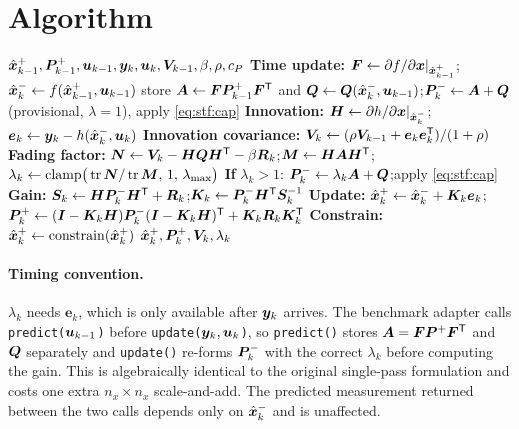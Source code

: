 \section{Algorithm}
\begin{algorithm}[H]
\caption{STF --- one sampling period}
\begin{algorithmic}[1]
\Require $\hat{\bm{x}}^{+}_{k-1},\bm{P}^{+}_{k-1},\bm{u}_{k-1},\bm{y}_k,\bm{u}_k,\bm{V}_{k-1},\beta,\rho,c_P$
\State \textbf{Time update:} $\bm{F}\gets\partial f/\partial\bm{x}|_{\hat{\bm{x}}^{+}_{k-1}}$;\quad $\hat{\bm{x}}^{-}_k\gets f(\hat{\bm{x}}^{+}_{k-1},\bm{u}_{k-1})$
\State \quad store $\bm{A}\gets\bm{F}\bm{P}^{+}_{k-1}\bm{F}^{\mathsf{T}}$ and $\bm{Q}\gets\bm{Q}(\hat{\bm{x}}^{-}_k,\bm{u}_{k-1})$;\quad $\bm{P}^{-}_k\gets\bm{A}+\bm{Q}$ (provisional, $\lambda=1$), apply \eqref{eq:stf:cap}
\State \textbf{Innovation:} $\bm{H}\gets\partial h/\partial\bm{x}|_{\hat{\bm{x}}^{-}_k}$;\quad $\bm{e}_k\gets\bm{y}_k-h(\hat{\bm{x}}^{-}_k,\bm{u}_k)$
\State \textbf{Innovation covariance:} $\bm{V}_k\gets(\rho\bm{V}_{k-1}+\bm{e}_k\bm{e}_k^{\mathsf{T}})/(1+\rho)$
\State \textbf{Fading factor:} $\bm{N}\gets\bm{V}_k-\bm{H}\bm{Q}\bm{H}^{\mathsf{T}}-\beta\bm{R}_k$;\quad $\bm{M}\gets\bm{H}\bm{A}\bm{H}^{\mathsf{T}}$;\quad
       $\lambda_k\gets\mathrm{clamp}\big(\operatorname{tr}\bm{N}/\operatorname{tr}\bm{M},\,1,\,\lambda_{\max}\big)$
\State \textbf{If} $\lambda_k>1$: $\bm{P}^{-}_k\gets\lambda_k\bm{A}+\bm{Q}$;\quad apply \eqref{eq:stf:cap}
\State \textbf{Gain:} $\bm{S}_k\gets\bm{H}\bm{P}^{-}_k\bm{H}^{\mathsf{T}}+\bm{R}_k$;\quad $\bm{K}_k\gets\bm{P}^{-}_k\bm{H}^{\mathsf{T}}\bm{S}_k^{-1}$
\State \textbf{Update:} $\hat{\bm{x}}^{+}_k\gets\hat{\bm{x}}^{-}_k+\bm{K}_k\bm{e}_k$;\quad
       $\bm{P}^{+}_k\gets(\bm{I}-\bm{K}_k\bm{H})\bm{P}^{-}_k(\bm{I}-\bm{K}_k\bm{H})^{\mathsf{T}}+\bm{K}_k\bm{R}_k\bm{K}_k^{\mathsf{T}}$
\State \textbf{Constrain:} $\hat{\bm{x}}^{+}_k\gets\mathrm{constrain}(\hat{\bm{x}}^{+}_k)$
\Ensure $\hat{\bm{x}}^{+}_k,\bm{P}^{+}_k,\bm{V}_k,\lambda_k$
\end{algorithmic}
\end{algorithm}

\paragraph{Timing convention.}  $\lambda_k$ needs $\bm{e}_k$, which is only available after $\bm{y}_k$
arrives.  The benchmark adapter calls \texttt{predict($\bm{u}_{k-1}$)} before
\texttt{update($\bm{y}_k,\bm{u}_k$)}, so \texttt{predict()} stores $\bm{A}=\bm{F}\bm{P}^{+}\bm{F}^{\mathsf{T}}$ and $\bm{Q}$
separately and \texttt{update()} re-forms $\bm{P}^{-}_k$ with the correct $\lambda_k$ before computing
the gain.  This is algebraically identical to the original single-pass formulation and costs one
extra $n_x\times n_x$ scale-and-add.  The predicted measurement returned between the two calls
depends only on $\hat{\bm{x}}^{-}_k$ and is unaffected.


